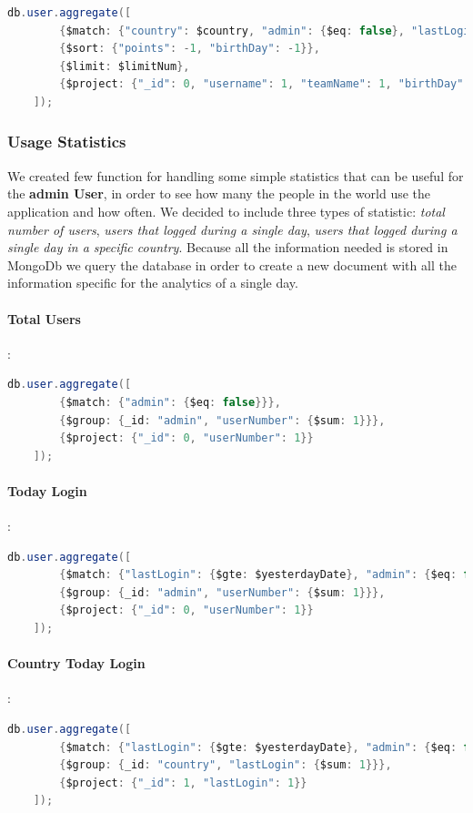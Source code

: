 \begin{lstlisting}[language=Java]
	db.user.aggregate([
		{$match: {"country": $country, "admin": {$eq: false}, "lastLogin": {$lte: $tresholdDate}}},
		{$sort: {"points": -1, "birthDay": -1}},
		{$limit: $limitNum},
		{$project: {"_id": 0, "username": 1, "teamName": 1, "birthDay":1, "country": 1}}
	]);
\end{lstlisting}




\subsubsection{Usage Statistics}
We created few function for handling some simple statistics that can be useful for the \textbf{admin User}, in order to see how many the people in the world use the application and how often. We decided to include three types of statistic: \textit{total number of users}, \textit{users that logged during a single day}, \textit{users that logged during a single day in a specific country}. Because all the information needed is stored in MongoDb we query the database in order to create a new document with all the information specific for the analytics of a single day.

\paragraph{Total Users}:
\begin{lstlisting}[language=Java]
	db.user.aggregate([
		{$match: {"admin": {$eq: false}}},
		{$group: {_id: "admin", "userNumber": {$sum: 1}}},
		{$project: {"_id": 0, "userNumber": 1}}
	]);
\end{lstlisting}
\paragraph{Today Login}:
\begin{lstlisting}[language=Java]
	db.user.aggregate([
		{$match: {"lastLogin": {$gte: $yesterdayDate}, "admin": {$eq: false}}},
		{$group: {_id: "admin", "userNumber": {$sum: 1}}},
		{$project: {"_id": 0, "userNumber": 1}}
	]);
\end{lstlisting}
\paragraph{Country Today Login}:
\begin{lstlisting}[language=Java]
	db.user.aggregate([
		{$match: {"lastLogin": {$gte: $yesterdayDate}, "admin": {$eq: false}}},
		{$group: {_id: "country", "lastLogin": {$sum: 1}}},
		{$project: {"_id": 1, "lastLogin": 1}}
	]);
\end{lstlisting}
